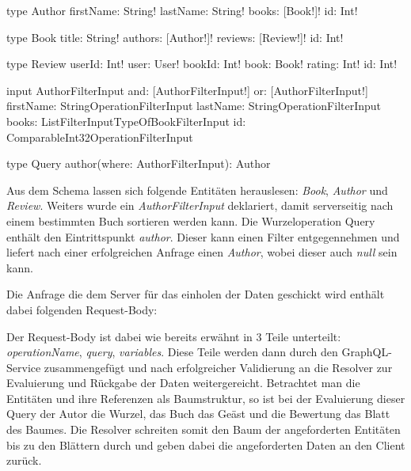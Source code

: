 \begin{JsCode}
type Author {
    firstName: String!
    lastName: String!
    books: [Book!]!
    id: Int!
}

type Book {
    title: String!
    authors: [Author!]!
    reviews: [Review!]!
    id: Int!
}

type Review {
    userId: Int!
    user: User!
    bookId: Int!
    book: Book!
    rating: Int!
    id: Int!
}

input AuthorFilterInput {
    and: [AuthorFilterInput!]
    or: [AuthorFilterInput!]
    firstName: StringOperationFilterInput
    lastName: StringOperationFilterInput
    books: ListFilterInputTypeOfBookFilterInput
    id: ComparableInt32OperationFilterInput
}

type Query {
    author(where: AuthorFilterInput): Author
}
\end{JsCode}

Aus dem Schema lassen sich folgende Entitäten herauslesen: \textit{Book}, \textit{Author} und \textit{Review}.
Weiters wurde ein \textit{AuthorFilterInput} deklariert, damit serverseitig nach einem bestimmten Buch sortieren werden kann.
Die Wurzeloperation Query enthält den Eintrittspunkt \textit{author}.
Dieser kann einen Filter entgegennehmen und liefert nach einer erfolgreichen Anfrage einen \textit{Author}, wobei dieser auch \textit{null} sein kann.

Die Anfrage die dem Server für das einholen der Daten geschickt wird enthält dabei folgenden Request-Body:


Der Request-Body ist dabei wie bereits erwähnt in 3 Teile unterteilt: \textit{operationName}, \textit{query}, \textit{variables}.
Diese Teile werden dann durch den GraphQL-Service zusammengefügt und nach erfolgreicher Validierung an die Resolver zur Evaluierung und Rückgabe der Daten weitergereicht.
Betrachtet man die Entitäten und ihre Referenzen als Baumstruktur, so ist bei der Evaluierung dieser Query der Autor die Wurzel, das Buch das Geäst und die Bewertung das Blatt des Baumes.
Die Resolver schreiten somit den Baum der angeforderten Entitäten bis zu den Blättern durch und geben dabei die angeforderten Daten an den Client zurück.

